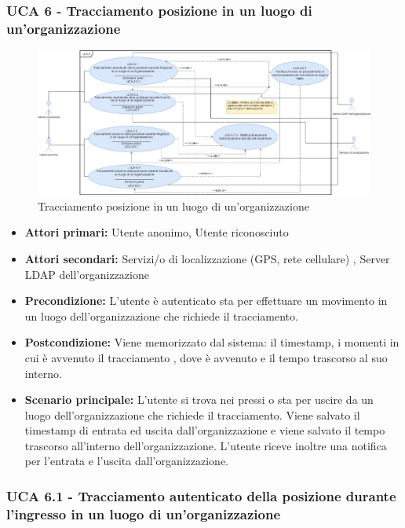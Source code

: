 \subsubsection{UCA 6 - Tracciamento posizione in un luogo di un'organizzazione}%

\begin{figure}[h]
	\centering
	\includegraphics[scale=0.3, center]{sezioni/UseCase/Immagini/UCA6.png}
	\caption{Tracciamento posizione in un luogo di un'organizzazione}
\end{figure}

\begin{itemize}
	\item \textbf{Attori primari:} Utente anonimo, Utente riconosciuto
	\item \textbf{Attori secondari:} Servizi/o di localizzazione (GPS, rete cellulare) , Server LDAP dell'organizzazione
	\item \textbf{Precondizione:} L'utente è autenticato sta per effettuare un movimento in un luogo dell'organizzazione che richiede il tracciamento.
	\item \textbf{Postcondizione:} Viene memorizzato dal sistema: il timestamp, i momenti in cui è avvenuto il tracciamento , dove è avvenuto e il tempo trascorso al suo interno.
	\item \textbf{Scenario principale:} L'utente si trova nei pressi o sta per uscire da un luogo dell'organizzazione che richiede il tracciamento. Viene salvato il timestamp di entrata ed uscita dall'organizzazione e viene salvato il tempo trascorso all'interno dell'organizzazione. L'utente riceve inoltre una notifica per l'entrata e l'uscita dall'organizzazione.
\end{itemize}

\subsubsection{UCA 6.1 - Tracciamento autenticato della posizione durante l'ingresso in un luogo di un'organizzazione}

